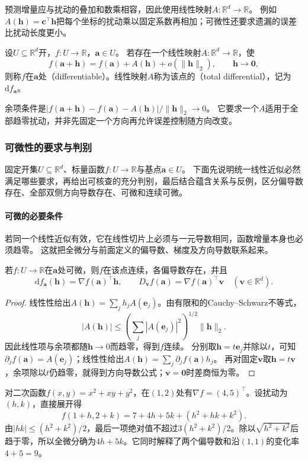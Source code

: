 预测增量应与扰动的叠加和数乘相容，因此使用线性映射$A:\mathbb R^d\to\mathbb R$。
例如$A(\bm h)=\bm c^\top\bm h$把每个坐标的扰动乘以固定系数再相加；可微性还要求遗漏的误差比扰动长度更小。
\begin{definition}[多元标量函数的可微性与全微分]
\label{def:multivariable-total-differential}
设$U\subseteq\mathbb R^d$开，$f:U\to\mathbb R$，$\bm a\in U$。
若存在一个线性映射$A:\mathbb R^d\to\mathbb R$，使
\begin{equation}
 f(\bm a+\bm h)=f(\bm a)+A(\bm h)+o(\lVert\bm h\rVert_2),
 \qquad\bm h\to\bm0,
\label{eq:analysis-total-differentiability}
\end{equation}
则称$f$在$\bm a$处（differentiable）。线性映射$A$称为该点的（total differential），记为$\mathrm df_{\bm a}$。
\end{definition}
余项条件是$|f(\bm a+\bm h)-f(\bm a)-A(\bm h)|/\lVert\bm h\rVert_2\to0$。
它要求一个$A$适用于全部趋零扰动，并非先固定一个方向再允许误差控制随方向改变。

\subsubsection{可微性的要求与判别}
\label{sec:analysis-differentiability-relations}

固定开集$U\subseteq\mathbb R^d$、标量函数$f:U\to\mathbb R$与基点$\bm a\in U$。
下面先说明统一线性近似必然满足哪些要求，再给出可核查的充分判别，最后结合蕴含关系与反例，区分偏导数存在、全部双侧方向导数存在、可微和连续可微。

\paragraph{可微的必要条件}
若同一个线性近似有效，它在线性切片上必须与一元导数相同，函数增量本身也必须趋零。
这就把全微分与前面定义的偏导数、梯度及方向导数联系起来。
\begin{theorem}
\label{thm:multivariable-differentiable-necessary}
若$f:U\to\mathbb R$在$\bm a$处可微，则$f$在该点连续，各偏导数存在，并且
\[
 \mathrm df_{\bm a}(\bm h)=\nabla f(\bm a)^\top\bm h,
 \qquad D_{\bm v}f(\bm a)=\nabla f(\bm a)^\top\bm v
 \quad(\bm v\in\mathbb R^d).
\]
\end{theorem}
\begin{proof}
线性性给出$A(\bm h)=\sum_jh_jA(\bm e_j)$。由有限和的Cauchy--Schwarz不等式，
\[
 |A(\bm h)|\leq\left(\sum_j|A(\bm e_j)|^2\right)^{1/2}\lVert\bm h\rVert_2.
\]
因此线性项与余项都随$\bm h\to0$而趋零，得到$f$连续。
分别取$\bm h=t\bm e_j$并除以$t$，可知$\partial_jf(\bm a)=A(\bm e_j)$；线性性给出$A(\bm h)=\sum_j\partial_jf(\bm a)h_j$。
再对固定$\bm v$取$\bm h=t\bm v$，余项除以$t$仍趋零，就得到方向导数公式；$\bm v=\bm0$时差商恒为零。
\end{proof}
\begin{example}[二元二次函数的全微分]
\label{ex:multivariable-quadratic-differential}
对二次函数$f(x,y)=x^2+xy+y^2$，在$(1,2)$处有$\nabla f=(4,5)^\top$。设扰动为$(h,k)$，直接展开得
\[
 f(1+h,2+k)=7+4h+5k+(h^2+hk+k^2).
\]
由$|hk|\leq(h^2+k^2)/2$，最后一项绝对值不超过$3(h^2+k^2)/2$。除以$\sqrt{h^2+k^2}$后趋于零，所以全微分确为$4h+5k$。它同时解释了两个偏导数和沿$(1,1)$的变化率$4+5=9$。
\end{example}



